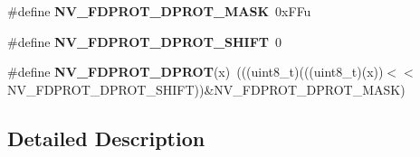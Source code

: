 \begin{DoxyCompactItemize}
\item 
\#define {\bfseries N\+V\+\_\+\+F\+D\+P\+R\+O\+T\+\_\+\+D\+P\+R\+O\+T\+\_\+\+M\+A\+SK}~0x\+F\+Fu\hypertarget{group__NV__Register__Masks_ga004ff32c4f18a922a47aaf9adea14d41}{}\label{group__NV__Register__Masks_ga004ff32c4f18a922a47aaf9adea14d41}

\item 
\#define {\bfseries N\+V\+\_\+\+F\+D\+P\+R\+O\+T\+\_\+\+D\+P\+R\+O\+T\+\_\+\+S\+H\+I\+FT}~0\hypertarget{group__NV__Register__Masks_gaf2019bf7c0b8e9dc5efcc385cc50f35b}{}\label{group__NV__Register__Masks_gaf2019bf7c0b8e9dc5efcc385cc50f35b}

\item 
\#define {\bfseries N\+V\+\_\+\+F\+D\+P\+R\+O\+T\+\_\+\+D\+P\+R\+OT}(x)~(((uint8\+\_\+t)(((uint8\+\_\+t)(x))$<$$<$N\+V\+\_\+\+F\+D\+P\+R\+O\+T\+\_\+\+D\+P\+R\+O\+T\+\_\+\+S\+H\+I\+FT))\&N\+V\+\_\+\+F\+D\+P\+R\+O\+T\+\_\+\+D\+P\+R\+O\+T\+\_\+\+M\+A\+SK)\hypertarget{group__NV__Register__Masks_ga47f6e3be836c5d3a4a358a2dfcca5cfe}{}\label{group__NV__Register__Masks_ga47f6e3be836c5d3a4a358a2dfcca5cfe}

\end{DoxyCompactItemize}


\subsection{Detailed Description}

